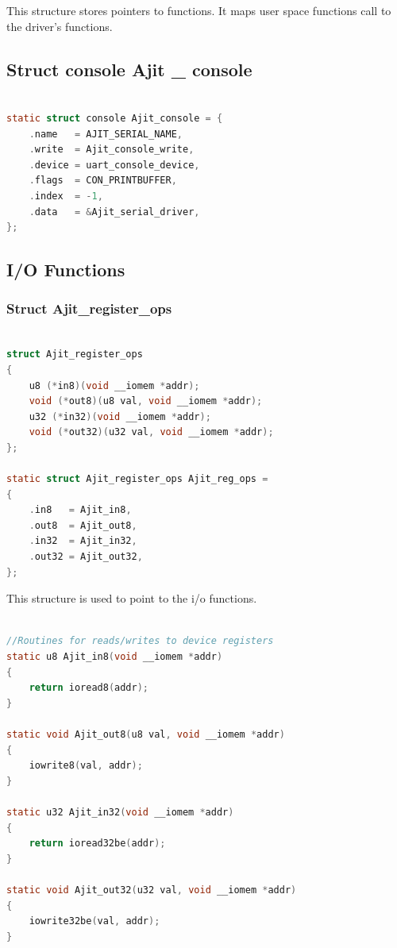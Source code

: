 \documentclass[12pt,a4paper]{article}
\begin{document}
This structure stores pointers to functions. It maps user space functions call to the driver's functions. \\

\subsection{Struct console Ajit \_ console}
\begin{lstlisting}[backgroundcolor = \color{white},
                   language = C,
                   xleftmargin = 2cm,
                   framexleftmargin = 1em]
                   
static struct console Ajit_console = {
	.name	= AJIT_SERIAL_NAME,
	.write	= Ajit_console_write,
	.device	= uart_console_device,
	.flags	= CON_PRINTBUFFER,
	.index	= -1, 
	.data	= &Ajit_serial_driver,
};
\end{lstlisting}	
\subsection{I/O Functions}
\subsubsection{Struct Ajit\_register\_ops}
\begin{lstlisting}[backgroundcolor = \color{white},
                   language = C,
                   xleftmargin = 2cm,
                   framexleftmargin = 1em]
                   
struct Ajit_register_ops 
{
	u8 (*in8)(void __iomem *addr);
	void (*out8)(u8 val, void __iomem *addr);
	u32 (*in32)(void __iomem *addr);
	void (*out32)(u32 val, void __iomem *addr);
};

static struct Ajit_register_ops Ajit_reg_ops = 
{
	.in8   = Ajit_in8,
	.out8  = Ajit_out8,
	.in32  = Ajit_in32,
	.out32 = Ajit_out32,
};

\end{lstlisting}	

This structure is used to point to the i/o functions.

\begin{lstlisting}[backgroundcolor = \color{white},
                   language = C,
                   xleftmargin = 2cm,
                   framexleftmargin = 1em]
                   
//Routines for reads/writes to device registers
static u8 Ajit_in8(void __iomem *addr)
{
	return ioread8(addr);
}

static void Ajit_out8(u8 val, void __iomem *addr)
{
	iowrite8(val, addr);
}

static u32 Ajit_in32(void __iomem *addr)
{
	return ioread32be(addr);
}

static void Ajit_out32(u32 val, void __iomem *addr)
{
	iowrite32be(val, addr);
}
\end{lstlisting}	
\end{document}
